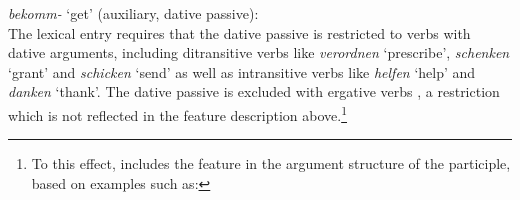 \documentclass[output=paper
	        ,collection
	        ,collectionchapter
 	        ,biblatex
                ,babelshorthands
                ,newtxmath
                ,draftmode
                ,colorlinks, citecolor=brown
]{./langsci/langscibook}
\begin{document}
\ea \label{get2}
\textit{bekomm-} `get' (auxiliary, dative passive): \\
\z 
The lexical entry requires that the dative passive is restricted to verbs with dative arguments, including ditransitive verbs like \textit{verordnen} `prescribe', \textit{schenken} `grant' and \textit{schicken} `send' as well as intransitive verbs like \textit{helfen} `help' and \textit{danken} `thank'. The dative passive is excluded with ergative verbs \citep[298]{mueller2013}, a restriction which is not reflected in the feature description above.\footnote{To this effect, \cite[298, 313]{mueller2013} includes the feature \da in the argument structure of the participle, based on examples such as:
\z
}
\end{document}
